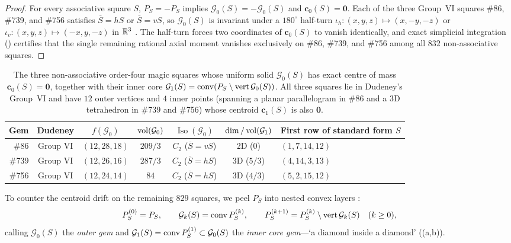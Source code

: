\begin{proof}
For every associative square $S$, $P_S=-P_S$ implies $\mathcal G_0(S)=-\mathcal G_0(S)$ and $\mathbf c_0(S)=\mathbf 0$. Each of the three Group~VI squares \#86, \#739, and \#756 satisfies $\overline S = hS$ or $\overline S = vS$, so $\mathcal G_0(S)$ is invariant under a $180^\circ$ half-turn $\iota_h\colon(x,y,z)\mapsto(x,-y,-z)$ or $\iota_v\colon(x,y,z)\mapsto(-x,y,-z)$ in $\mathbb{R}^3$ \citep{mathewson2026gems}. The half-turn forces two coordinates of $\mathbf c_0(S)$ to vanish identically, and exact simplicial integration () certifies that the single remaining rational axial moment vanishes exclusively on \#86, \#739, and \#756 among all $832$ non-associative squares.
\end{proof}

\begin{table}[htbp]
\centering
\caption{The three non-associative order-four magic squares whose uniform solid $\mathcal G_0(S)$ has exact centre of mass $\mathbf c_0(S)=\mathbf 0$, together with their inner core $\mathcal G_1(S)=\operatorname{conv}(P_S\setminus\operatorname{vert}\mathcal G_0(S))$. All three squares lie in Dudeney's Group~VI and have $12$ outer vertices and $4$ inner points (spanning a planar parallelogram in \#86 and a 3D tetrahedron in \#739 and \#756) whose centroid $\mathbf c_1(S)$ is also $\mathbf 0$.}
\label{tab:three-exceptions}
\small
\setlength{\tabcolsep}{4.5pt}
\begin{tabular}{r c c c c c l}
\toprule
Gem & Dudeney & $f(\mathcal G_0)$ & $\operatorname{vol}(\mathcal G_0)$ & $\operatorname{Iso}(\mathcal G_0)$ & $\dim/\operatorname{vol}(\mathcal G_1)$ & First row of standard form $S$\\
\midrule
\#86  & Group VI & $(12,28,18)$ & $209/3$ & $C_2$ ($\overline S=vS$) & $2\mathrm{D}$ ($0$) & $(1,7,14,12)$\\
\#739 & Group VI & $(12,26,16)$ & $287/3$ & $C_2$ ($\overline S=hS$) & $3\mathrm{D}$ ($5/3$) & $(4,14,3,13)$\\
\#756 & Group VI & $(12,24,14)$ & $84$    & $C_2$ ($\overline S=hS$) & $3\mathrm{D}$ ($4/3$) & $(5,2,15,12)$\\
\bottomrule
\end{tabular}
\end{table}

To counter the centroid drift on the remaining $829$ squares, we peel $P_S$ into nested convex layers \citep{chazelle1985convex}:
\begin{equation}
\label{eq:peeling}
P_S^{(0)} = P_S,\qquad
\mathcal G_k(S) = \operatorname{conv} P_S^{(k)},\qquad
P_S^{(k+1)} = P_S^{(k)} \setminus \operatorname{vert}\mathcal G_k(S)\quad (k\ge0),
\end{equation}
calling $\mathcal G_0(S)$ the \emph{outer gem} and $\mathcal G_1(S)=\operatorname{conv} P_S^{(1)}\subset\mathcal G_0(S)$ the \emph{inner core gem}—`a diamond inside a diamond' ((a,b)).

